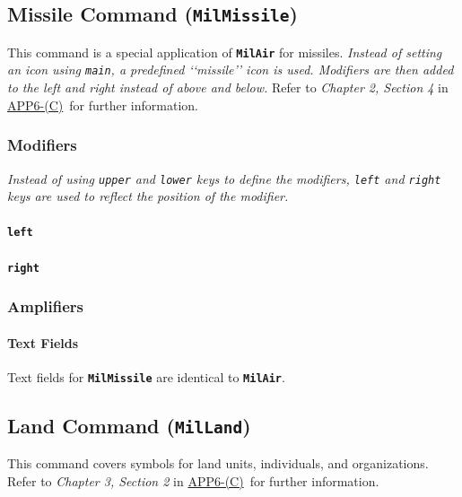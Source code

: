 \documentclass[a4paper, titlepage]{article}
\newcommand\DocLink{\href{https://www.awl.edu.pl/images/en/APP_6_C.pdf}{APP6-(C)}}
\begin{document}
\subsection{Missile Command (\textbf{\texttt{MilMissile}})}

This command is a special application of \textbf{\texttt{MilAir}} for missiles. \textit{Instead of setting an icon using \texttt{main}, a predefined \lq\lq{}missile\rq\rq{} icon is used. Modifiers are then added to the left and right instead of above and below.} Refer to \textit{Chapter 2, Section 4} in \DocLink\ for further information.

\subsubsection{Modifiers}

\textit{Instead of using \texttt{upper} and \texttt{lower} keys to define the modifiers, \texttt{left} and \texttt{right} keys are used to reflect the position of the modifier.}

\paragraph{\texttt{left}}\quad


\paragraph{\texttt{right}}\quad


\subsubsection{Amplifiers}

\paragraph{Text Fields}

Text fields for \textbf{\texttt{MilMissile}} are identical to \textbf{\texttt{MilAir}}.

\subsection{Land Command (\textbf{\texttt{MilLand}})}

This command covers symbols for land units, individuals, and organizations. Refer to \textit{Chapter 3, Section 2} in \DocLink\ for further information.
\end{document}
